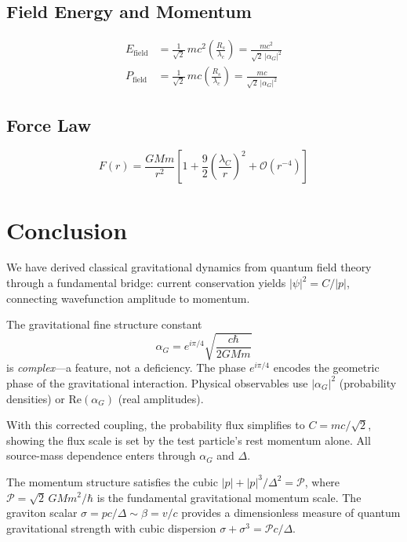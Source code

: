 \documentclass[11pt,a4paper]{article}
\theoremstyle{definition}
\theoremstyle{remark}
\begin{document}
	\subsection{Field Energy and Momentum}
	
	\begin{align}
		E_{\mathrm{field}} &= \frac{1}{\sqrt{2}}\,mc^2\left(\frac{R_s}{\lambda_c}\right) = \frac{mc^2}{\sqrt{2}\,|\alpha_G|^2} \\
		P_{\mathrm{field}} &= \frac{1}{\sqrt{2}}\,mc\left(\frac{R_s}{\lambda_c}\right) = \frac{mc}{\sqrt{2}\,|\alpha_G|^2}
	\end{align}
	
	\subsection{Force Law}
	
	\begin{equation}
		F(r) = \frac{GMm}{r^2}\left[1 + \frac{9}{2}\left(\frac{\lambda_C}{r}\right)^2 + \mathcal{O}(r^{-4})\right]
	\end{equation}
	
	\section{Conclusion}
	
	We have derived classical gravitational dynamics from quantum field theory through a fundamental bridge: current conservation yields $|\psi|^2=C/|p|$, connecting wavefunction amplitude to momentum.
	
	The gravitational fine structure constant
	\begin{equation*}
		\alpha_G = e^{i\pi/4}\sqrt{\frac{c\hbar}{2GMm}}
	\end{equation*}
	is \emph{complex}---a feature, not a deficiency.  The phase $e^{i\pi/4}$ encodes the geometric phase of the gravitational interaction.  Physical observables use $|\alpha_G|^2$ (probability densities) or $\mathrm{Re}(\alpha_G)$ (real amplitudes).
	
	With this corrected coupling, the probability flux simplifies to $C=mc/\sqrt{2}$, showing the flux scale is set by the test particle's rest momentum alone.  All source-mass dependence enters through $\alpha_G$ and $\Delta$.
	
	The momentum structure satisfies the cubic $|p|+|p|^3/\Delta^2=\mathcal{P}$, where $\mathcal{P}=\sqrt{2}\,GMm^2/\hbar$ is the fundamental gravitational momentum scale.  The graviton scalar $\sigma=pc/\Delta\sim\beta=v/c$ provides a dimensionless measure of quantum gravitational strength with cubic dispersion $\sigma+\sigma^3=\mathcal{P}c/\Delta$.
	
\end{document}

